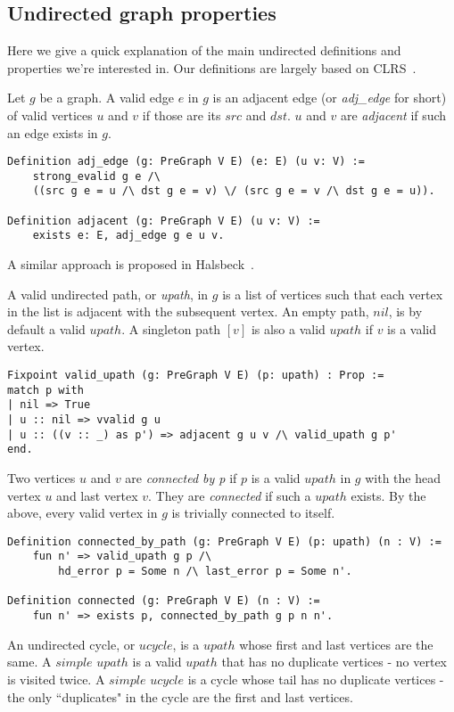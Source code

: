 \subsection{Undirected graph properties}

Here we give a quick explanation of the main undirected definitions and properties we're interested in. Our definitions are largely based on CLRS~\cite{clrs}.

Let $g$ be a graph. A valid edge $e$ in $g$ is an adjacent edge (or \textit{adj\_edge} for short) of valid vertices $u$ and $v$ if those are its $src$ and $dst$. $u$ and $v$ are \textit{adjacent} if such an edge exists in $g$.
\begin{lstlisting}
Definition adj_edge (g: PreGraph V E) (e: E) (u v: V) :=
	strong_evalid g e /\
	((src g e = u /\ dst g e = v) \/ (src g e = v /\ dst g e = u)).

Definition adjacent (g: PreGraph V E) (u v: V) :=
	exists e: E, adj_edge g e u v.
\end{lstlisting}
A similar approach is proposed in Halsbeck~\cite{DBLP:journals/afp/HaslbeckLB19}.

A valid undirected path, or \textit{upath}, in $g$ is a list of vertices such that each vertex in the list is adjacent with the subsequent vertex. An empty path, $nil$, is by default a valid $upath$. A singleton path $[v]$ is also a valid $upath$ if $v$ is a valid vertex.
\begin{lstlisting}
Fixpoint valid_upath (g: PreGraph V E) (p: upath) : Prop :=
match p with
| nil => True
| u :: nil => vvalid g u
| u :: ((v :: _) as p') => adjacent g u v /\ valid_upath g p'
end.
\end{lstlisting}
Two vertices $u$ and $v$ are \textit{connected by p} if $p$ is a valid $upath$ in $g$ with the head vertex $u$ and last vertex $v$. They are \textit{connected} if such a $upath$ exists. By the above, every valid vertex in $g$ is trivially connected to itself.
\begin{lstlisting}
Definition connected_by_path (g: PreGraph V E) (p: upath) (n : V) :=
	fun n' => valid_upath g p /\
		hd_error p = Some n /\ last_error p = Some n'.

Definition connected (g: PreGraph V E) (n : V) :=
	fun n' => exists p, connected_by_path g p n n'.
\end{lstlisting}
An undirected cycle, or $ucycle$, is a $upath$ whose first and last vertices are the same. A $simple$ $upath$ is a valid $upath$ that has no duplicate vertices - no vertex is visited twice. A $simple$ $ucycle$ is a cycle whose tail has no duplicate vertices - the only ``duplicates" in the cycle are the first and last vertices.

